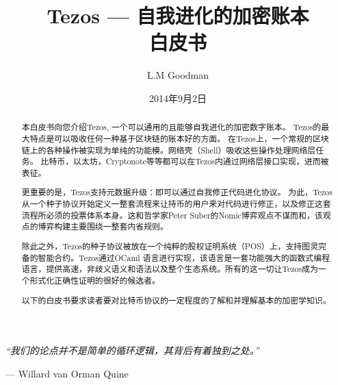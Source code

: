 \documentclass[letterpaper]{article}
\author{L.M Goodman}
\date{2014年9月2日}
\title{Tezos --- 自我进化的加密账本 \\ 白皮书}
\begin{document}
\maketitle

\epigraph{\emph{``我们的论点并不是简单的循环逻辑，其背后有着独到之处。''}}
{--- \textup{Willard van Orman Quine}}


\begin{abstract}
本白皮书向您介绍Tezos, 一个可以通用的且能够自我进化的加密数字账本。
Tezos的最大特点是可以吸收任何一种基于区块链的账本好的方面。
在Tezos上，一个常规的区块链上的各种操作被实现为单纯的功能模。网络壳（Shell）吸收这些操作处理网络层任务。
比特币，以太坊，Cryptonote等等都可以在Tezos内通过网络层接口实现，进而被表征。


更重要的是，Tezos支持元数据升级：即可以通过自我修正代码进化协议。
为此，Tezos从一个种子协议开始定义一整套流程来让持币的用户来对代码进行修正，以及修正这套流程所必须的投票体系本身。这和哲学家Peter Suber的Nomic\cite{Nomic}博弈观点不谋而和，该观点的博弈构建主要围绕一整套内省规则。

除此之外，Tezos的种子协议被放在一个纯粹的股权证明系统（POS）上，支持图灵完备的智能合约。Tezos通过OCaml 语言进行实现，该语言是一套功能强大的函数式编程语言，提供高速，非歧义语义和语法以及整个生态系统。所有的这一切让Tezos成为一个形式化正确性证明的很好的候选者。

以下的白皮书要求读者要对比特币协议的一定程度的了解和并理解基本的加密学知识。

\end{abstract}
\newpage
\end{document}
